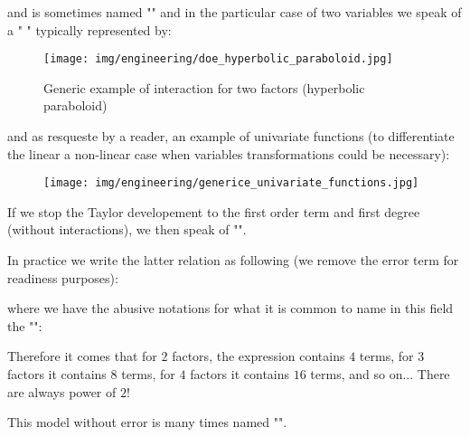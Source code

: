 	and is sometimes named "" and in the particular case of two variables we speak of a " " typically represented by:
	\begin{figure}[H]
		\centering
		\texttt{[image: img/engineering/doe\_hyperbolic\_paraboloid.jpg]}	
		\caption{Generic example of interaction for two factors (hyperbolic paraboloid)}
	\end{figure}
	and as resqueste by a reader, an example of univariate functions (to differentiate the linear a non-linear case when variables transformations could be necessary):
	\begin{figure}[H]
		\centering
		\texttt{[image: img/engineering/generice\_univariate\_functions.jpg]}	
	\end{figure}
	\begin{tcolorbox}[title=Remark,colframe=black,arc=10pt]
	If we stop the Taylor developement to the first order term and first degree (without interactions), we then speak of "".
	\end{tcolorbox}
	
	In practice we write the latter relation as following (we remove the error term for readiness purposes):
	
	where we have the abusive notations for what it is common to name in this field the "":
	
	Therefore it comes that for $2$ factors, the expression contains $4$ terms, for $3$ factors it contains $8$ terms, for $4$ factors it contains $16$ terms, and so on... There are always power of $2$!
	
	This model without error is many times named "".
	
